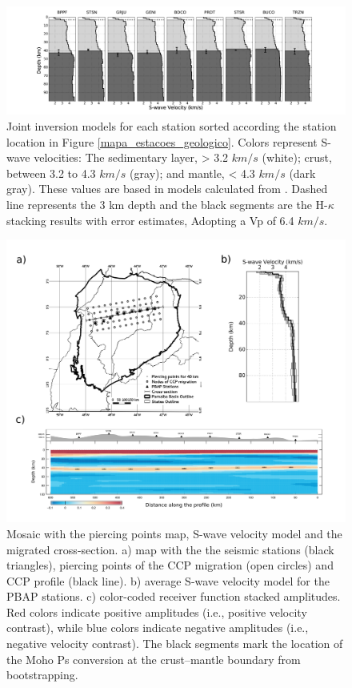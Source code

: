 \documentclass[paper,11pt]{geophysics}
\begin{document}
\begin{figure}[!ht]
\begin{center}
\includegraphics[width=1.1\textwidth]{Fig/section_joint_inversion_25.pdf}
\caption{Joint inversion models for each station sorted according the station location in Figure \ref{mapa_estacoes_geologico}. Colors represent S-wave velocities: The sedimentary layer, > 3.2 $km/s$ (white); crust, between 3.2 to 4.3 $km/s$ (gray); and mantle, < 4.3 $km/s$ (dark gray). These values are based in models calculated from \cite{mooney_crust_1998}. Dashed line represents the 3 km depth and the black segments are the H-$\kappa$ stacking results with error estimates, Adopting a Vp of 6.4 $km/s$.}
\label{moisaic_joint_inversion}
\end{center}
\end{figure}


\begin{figure}[!ht]
\begin{center}
\includegraphics[width=\textwidth]{Fig/section_migration.png}
\caption{Mosaic with the piercing points map, S-wave velocity model and the migrated cross-section. a) map with the the seismic stations (black triangles), piercing points of the CCP migration (open circles) and CCP profile (black line). b) average S-wave velocity model for the PBAP stations. c) color-coded receiver function stacked amplitudes. Red colors indicate positive amplitudes (i.e., positive velocity contrast), while blue colors indicate negative amplitudes (i.e., negative velocity contrast). The black segments mark the location of the Moho Ps conversion at the crust–mantle boundary from bootstrapping.}
\label{moisaic_migration}
\end{center}
\end{figure}
 
\end{document}
